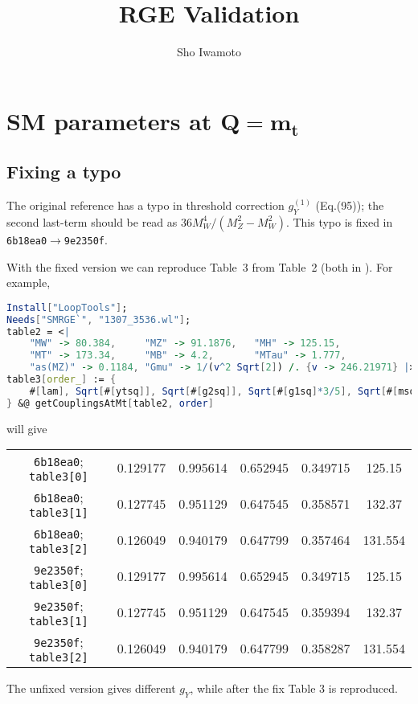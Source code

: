 \documentclass[a4paper,11pt]{scrartcl}
\title{RGE Validation}
\author{Sho Iwamoto}
\numberwithin{equation}{section}
\newcommand{\rev}[1]{{\color{magenta}\texttt{#1}}}
\begin{document}
\begin{center}{\makeatletter
{\huge{}\@title}\par\vspace{2em}
{\Large \@author}\par\vspace{2em}
}
\end{center}

\section[SM parameters at Q=mt]{SM parameters at $\boldsymbol{Q=m_t}$}
\subsection{Fixing a typo}
The original reference \cite[v4]{Buttazzo:2013uya} has a typo in threshold correction $g_Y^{(1)}$ (Eq.(95)); the second last-term should be read as $36M_W^4/(M_Z^2-M_W^2)$.
This typo is fixed in \rev{6b18ea0}$\to$\rev{9e2350f}.

With the fixed version we can reproduce Table~3 from Table~2 (both in \cite[v4]{Buttazzo:2013uya}).
For example,
\begin{lstlisting}[language=Mathematica]
Install["LoopTools"];
Needs["SMRGE`", "1307_3536.wl"];
table2 = <|
    "MW" -> 80.384,     "MZ" -> 91.1876,   "MH" -> 125.15,
    "MT" -> 173.34,     "MB" -> 4.2,       "MTau" -> 1.777,
    "as(MZ)" -> 0.1184, "Gmu" -> 1/(v^2 Sqrt[2]) /. {v -> 246.21971} |>
table3[order_] := {
    #[lam], Sqrt[#[ytsq]], Sqrt[#[g2sq]], Sqrt[#[g1sq]*3/5], Sqrt[#[msq]]
} &@ getCouplingsAtMt[table2, order]
\end{lstlisting}
will give
\begin{table}[h]\centering\small
 \begin{tabular}{c|ccccc}
 \rev{6b18ea0}; \texttt{table3[0]}
 & 0.129177 & 0.995614 & 0.652945 & 0.349715 & 125.15\\
 \rev{6b18ea0}; \texttt{table3[1]}
 & 0.127745 & 0.951129 & 0.647545 & 0.358571 & 132.37\\
 \rev{6b18ea0}; \texttt{table3[2]}
 & 0.126049 & 0.940179 & 0.647799 & 0.357464 & 131.554\\\hline
 \rev{9e2350f}; \texttt{table3[0]}
& 0.129177 & 0.995614 & 0.652945 & 0.349715 & 125.15\\
 \rev{9e2350f}; \texttt{table3[1]}
& 0.127745 & 0.951129 & 0.647545 & 0.359394 & 132.37\\
 \rev{9e2350f}; \texttt{table3[2]}
& 0.126049 & 0.940179 & 0.647799 & 0.358287 & 131.554\\
 \end{tabular}
\end{table}
The unfixed version gives different $g_Y$, while after the fix Table 3 is reproduced.
\end{document}
